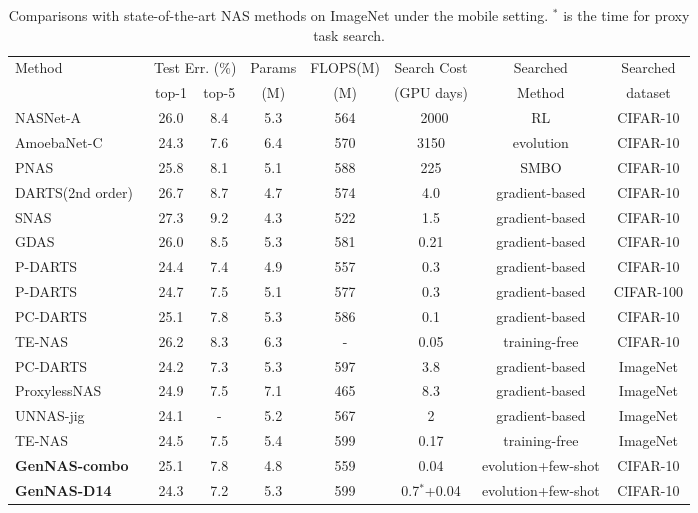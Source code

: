 \documentclass{article}
\begin{document}
\begin{table}[]
\scriptsize
  \caption{Comparisons with state-of-the-art NAS methods on ImageNet under the mobile setting. $^*$ is the time for proxy task search.
  }
  \label{table:GenNAS_NAS_Imagenet}
  \centering
  \scriptsize
\begin{tabular}{lccccccc}
\toprule
\multirow{2}{*}{Method} & \multicolumn{2}{c}{Test Err. (\%)} & Params & FLOPS(M) & Search Cost & Searched & Searched \\ \cline{2-3} 
                        & top-1          & top-5         &(M)&(M)&(GPU days)&Method&dataset
      \\ \midrule 
NASNet-A~\cite{zoph2018learning} &  26.0 &8.4&5.3&564&~2000&RL&CIFAR-10\\
AmoebaNet-C~\cite{real2019regularized} & 24.3 & 7.6 &  6.4 & 570 & 3150&evolution&CIFAR-10\\
PNAS~\cite{liu2018progressive}&25.8&8.1&5.1&588&225&SMBO&CIFAR-10\\
\midrule
DARTS(2nd order)~\cite{liu2018darts} &26.7& 8.7& 4.7& 574& 4.0& gradient-based&CIFAR-10\\

SNAS~\cite{xie2018snas}&27.3&9.2&4.3& 522& 1.5&gradient-based&CIFAR-10\\
GDAS~\cite{dong2019searching}&26.0&8.5&5.3&581&0.21&gradient-based&CIFAR-10\\
P-DARTS~\cite{chen2019progressive}&24.4&7.4 &4.9 &557 &0.3 &gradient-based &CIFAR-10\\
P-DARTS&24.7&7.5&5.1 &577 &0.3 &gradient-based &CIFAR-100\\
PC-DARTS~\cite{xu2019pc}&25.1 &7.8 &5.3 &586 &0.1 &gradient-based&CIFAR-10\\
TE-NAS~\cite{chen2021neural}&26.2 &8.3 &6.3&-& 0.05& training-free&CIFAR-10\\
\midrule
PC-DARTS&24.2 &7.3 &5.3 &597 &3.8 &gradient-based&ImageNet\\
ProxylessNAS~\cite{cai2018proxylessnas} &  24.9 &7.5 &7.1 &465 &8.3 &gradient-based&ImageNet\\
UNNAS-jig~\cite{liu2020labels}&24.1&-&5.2&567&2&gradient-based&ImageNet\\
TE-NAS& 24.5  &7.5 &5.4 & 599&0.17&training-free&ImageNet\\
\midrule
\textbf{GenNAS-combo} & 25.1&7.8&4.8&559&0.04&evolution+few-shot&CIFAR-10\\
\textbf{GenNAS-D14} & 24.3&7.2&5.3&599&0.7$^*$+0.04&evolution+few-shot&CIFAR-10\\
\bottomrule

\end{tabular}
\end{table}
\end{document}
